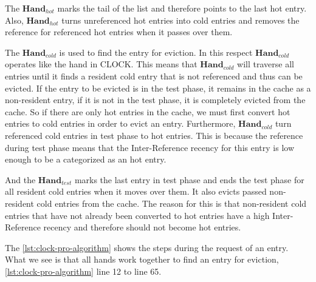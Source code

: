 \documentclass[
	12pt,
	a4paper,
	abstract,
	bibliography=totoc,
	chapterprefix,
	headings=openright,
	numbers=endperiod,
	parskip=half,
	twoside,
]{scrreprt}
\begin{document}
The $\textbf{Hand}_{hot}$ marks the tail of the list and therefore points to the last hot entry.
Also, $\textbf{Hand}_{hot}$ turns unreferenced hot entries into cold entries  and 
removes the reference for referenced hot entries when it passes over them.


The $\textbf{Hand}_{cold}$ is used to find the entry for eviction. 
In this respect $\textbf{Hand}_{cold}$ operates like the hand in CLOCK.
This means that $\textbf{Hand}_{cold}$ will traverse all entries until it finds a resident cold entry 
that is not referenced and thus can be evicted.
If the entry to be evicted is in the test phase, it remains in the cache as a non-resident entry, 
if it is not in the test phase, it is completely evicted from the cache.
So if there are only hot entries in the cache,  
we must first convert hot entries to cold entries in order to evict an entry.
Furthermore, $\textbf{Hand}_{cold}$ turn referenced cold entries in test phase to hot entries. 
This is because the reference during test phase means that the Inter-Reference recency for this entry is low enough 
to be a categorized as an hot entry.

And the $\textbf{Hand}_{test}$ marks the last entry in test phase and ends the test phase for all resident cold entries when it moves over them. 
It also evicts passed non-resident cold entries from the cache.
The reason for this is that non-resident cold entries that have not already been converted to hot entries have a high Inter-Reference recency 
and therefore should not become hot entries.

The \cref{lst:clock-pro-algorithm} shows the steps during the request of an entry.
What we see is that all hands work together to find an entry for eviction, \cref{lst:clock-pro-algorithm} line 12 to line 65.

\bigskip
\end{document}
